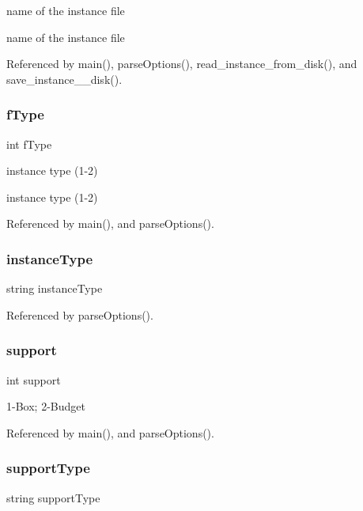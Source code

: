 name of the instance file 

name of the instance file 

Referenced by main(), parse\+Options(), read\+\_\+instance\+\_\+from\+\_\+disk(), and save\+\_\+instance\+\_\+\_\+disk().

\mbox{\label{options_8cpp_adf90957b4e032f69aba1e81ab396fa2f}} 
\subsubsection{f\+Type}
{\footnotesize\ttfamily int f\+Type}



instance type (1-\/2) 

instance type (1-\/2) 

Referenced by main(), and parse\+Options().

\mbox{\label{options_8cpp_a98f2e84701105ad45ed7158de7bfdfd0}} 
\subsubsection{instance\+Type}
{\footnotesize\ttfamily string instance\+Type}



Referenced by parse\+Options().

\mbox{\label{options_8cpp_ae8470b9dfef111e0d72a983ce72e4c9c}} 
\subsubsection{support}
{\footnotesize\ttfamily int support}



1-\/\+Box; 2-\/\+Budget 



Referenced by main(), and parse\+Options().

\mbox{\label{options_8cpp_a3853824cedf4d86c04beb83f79c09c92}} 
\subsubsection{support\+Type}
{\footnotesize\ttfamily string support\+Type}



